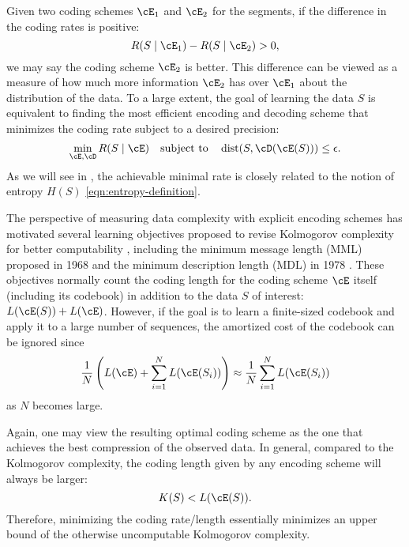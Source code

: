 \documentclass[../../book-main.tex]{subfiles}
\begin{document}
Given two coding schemes \(\cE_{1}\) and \(\cE_{2}\) for the segments, if the difference in the coding rates is positive:
\begin{equation}
   R(S \mid \cE_{1}) -  R(S \mid \cE_{2}) > 0, 
\end{equation}
we may say the coding scheme \(\cE_{2}\) is better. This difference can be viewed as a measure of how much more information \(\cE_{2}\) has over \(\cE_{1}\) about the distribution of the data. To a large extent, the goal of learning the data \(S\) is equivalent to finding the most efficient encoding and decoding scheme that minimizes the coding rate subject to a desired precision:
\begin{equation}
   \min_{\cE, \cD} R(S \mid \cE) \quad \text{subject to} \quad \operatorname{dist}(S, \cD(\cE(S))) \leq \epsilon. 
\end{equation}
As we will see in , the achievable minimal rate is closely related to the notion of entropy \(H(S)\) \eqref{eqn:entropy-definition}.


\begin{remark}\label{rem:computable-complexity}
    The perspective of measuring data complexity with explicit encoding schemes has motivated several learning objectives proposed to revise Kolmogorov complexity for better computability \cite{WallaceC1999}, including the minimum message length (MML) proposed in 1968 \cite{WallaceC1968} and the minimum description length (MDL) in 1978 \cite{Rissanen-1978,HansenM2001}. These objectives normally count the coding length for the coding scheme \(\cE\) itself (including its codebook) in addition to the data \(S\) of interest: \(L(\cE(S)) + L(\cE)\). However, if the goal is to learn a finite-sized codebook and apply it to a large number of sequences, the amortized cost of the codebook can be ignored since
    \begin{equation}
        \frac{1}{N}\left( L(\cE) + \sum_{i=1}^{N} L(\cE(S_{i}))\right) \approx \frac{1}{N}\sum_{i=1}^{N} L(\cE(S_{i}))
    \end{equation}
    as \(N\) becomes large.
\end{remark}

Again, one may view the resulting optimal coding scheme as the one that achieves the best compression of the observed data. In general, compared to the Kolmogorov complexity, the coding length given by any encoding scheme will always be larger:
\begin{equation}
    K(S) < L(\cE(S)).
\end{equation}
Therefore, minimizing the coding rate/length essentially minimizes an upper bound of the otherwise uncomputable Kolmogorov complexity.
\end{document}
